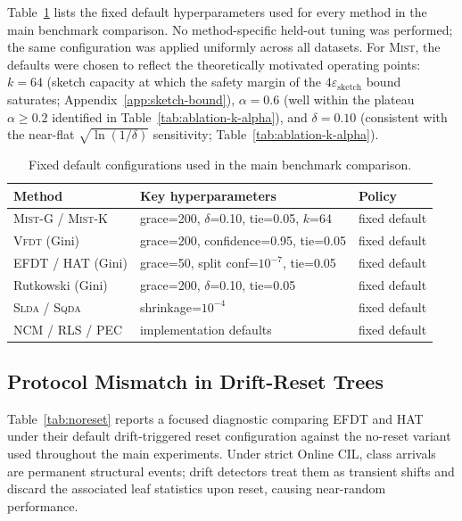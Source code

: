 \documentclass{article}
\newcommand{\mist}{\textsc{Mist}}
\newcommand{\vfdt}{\textsc{Vfdt}}
\newcommand{\slda}{\textsc{Slda}}
\newcommand{\sqda}{\textsc{Sqda}}
\begin{document}
Table~\ref{tab:hyperparams} lists the fixed default hyperparameters used for
every method in the main benchmark comparison. No method-specific held-out
tuning was performed; the same configuration was applied uniformly across all
datasets. For \mist{}, the defaults were chosen to reflect the theoretically
motivated operating points: $k{=}64$ (sketch capacity at which the safety
margin of the $4\varepsilon_{\mathrm{sketch}}$ bound saturates;
Appendix~\ref{app:sketch-bound}), $\alpha{=}0.6$ (well within the plateau
$\alpha \geq 0.2$ identified in Table~\ref{tab:ablation-k-alpha}),
and $\delta{=}0.10$ (consistent with the near-flat $\sqrt{\ln(1/\delta)}$
sensitivity; Table~\ref{tab:ablation-k-alpha}).

\begin{table}[h]
\caption{Fixed default configurations used in the main benchmark comparison.}
\label{tab:hyperparams}
\centering
\small
\begin{tabular}{lll}
\toprule
Method & Key hyperparameters & Policy \\
\midrule
\mist{}-G / \mist{}-K & grace=200, $\delta$=0.10, tie=0.05, $k$=64 & fixed default \\
\vfdt{} (Gini)         & grace=200, confidence=0.95, tie=0.05        & fixed default \\
EFDT / HAT (Gini)             & grace=50, split conf=$10^{-7}$, tie=0.05    & fixed default \\
Rutkowski (Gini)             & grace=200,  $\delta$=0.10, tie=0.05    & fixed default \\
\slda{} / \sqda{}      & shrinkage=$10^{-4}$                          & fixed default \\
NCM / RLS / PEC        & implementation defaults                       & fixed default \\
\bottomrule
\end{tabular}
\end{table}

\subsection{Protocol Mismatch in Drift-Reset Trees}
\label{app:noreset}

Table~\ref{tab:noreset} reports a focused diagnostic comparing EFDT and HAT
under their default drift-triggered reset configuration against the no-reset
variant used throughout the main experiments. Under strict Online CIL,
class arrivals are permanent structural events; drift detectors treat them
as transient shifts and discard the associated leaf statistics upon reset,
causing near-random performance.
\end{document}
